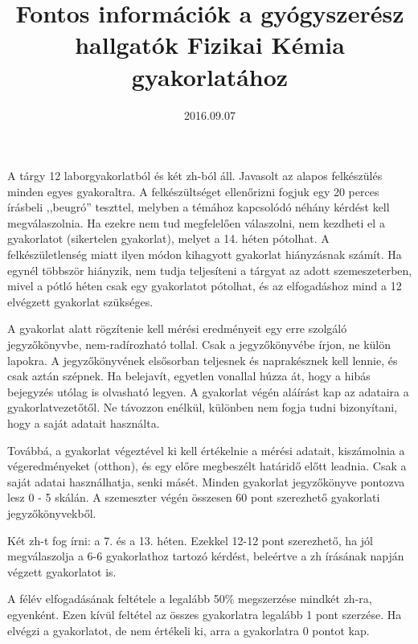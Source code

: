 \documentclass{article}
\begin{document}
\title{Fontos információk a  gyógyszerész hallgatók Fizikai Kémia gyakorlatához}
\date{2016.09.07}
\maketitle

A tárgy 12 laborgyakorlatból és két zh-ból áll. Javasolt az alapos felkészülés minden egyes gyakoraltra. A felkészültséget ellenőrizni fogjuk egy 20 perces írásbeli ,,beugró'' teszttel, melyben a témához kapcsolódó néhány kérdést kell megválaszolnia. Ha ezekre nem tud megfelelően válaszolni, nem kezdheti el a gyakorlatot (sikertelen gyakorlat), melyet a 14. héten pótolhat. A felkészületlenség miatt ilyen módon kihagyott gyakorlat hiányzásnak számít. Ha egynél többször hiányzik, nem tudja teljesíteni a tárgyat az adott szemeszeterben, mivel a pótló héten csak egy gyakorlatot pótolhat, és az elfogadáshoz mind a 12 elvégzett gyakorlat szükséges.

A gyakorlat alatt rögzítenie kell mérési eredményeit egy erre szolgáló jegyzőkönyvbe, nem-radírozható tollal. Csak a jegyzőkönyvébe írjon, ne külön lapokra. A jegyzőkönyvének elsősorban teljesnek és naprakésznek kell lennie, és csak aztán szépnek. Ha belejavít, egyetlen vonallal húzza át, hogy a hibás bejegyzés utólag is olvasható legyen. A gyakorlat végén aláírást kap az adataira a gyakorlatvezetőtől. Ne távozzon enélkül, különben nem fogja tudni bizonyítani, hogy a saját adatait használta.

Továbbá, a gyakorlat végeztével ki kell értékelnie a mérési adatait, kiszámolnia a végeredményeket (otthon), és egy előre megbeszélt határidő előtt leadnia. Csak a saját adatai használhatja, senki másét. Minden gyakorlat jegyzőkönyve pontozva lesz 0 - 5 skálán. A szemeszter végén összesen 60 pont szerezhető gyakorlati jegyzőkönyvekből.

Két zh-t fog írni: a 7. és a 13. héten. Ezekkel 12-12 pont szerezhető, ha jól megválaszolja a 6-6 gyakorlathoz tartozó kérdést, beleértve a zh írásának napján végzett gyakorlatot is. 

A félév elfogadásának feltétele a legalább 50\% megszerzése mindkét zh-ra, egyenként. Ezen kívül feltétel az összes gyakorlatra legalább 1 pont szerzése. Ha elvégzi a gyakorlatot, de nem értékeli ki, arra a gyakorlatra 0 pontot kap.
\end{document}
